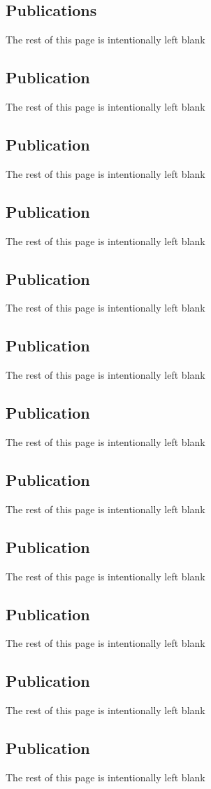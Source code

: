 \documentclass{article}
\def\lb{\vfill{The rest of this page is intentionally left blank}\vfill}
\begin{document}
\newpage
\center \subsection{Publications} 
 \lb 

\center \subsection{Publication} 
 \lb 

\center \subsection{Publication} 
 \lb 

\center \subsection{Publication} 
 \lb 

\center \subsection{Publication} 
 \lb 

\center \subsection{Publication} 
 \lb 

\center \subsection{Publication} 
 \lb 

\center \subsection{Publication} 
 \lb 

\center \subsection{Publication} 
 \lb 

\center \subsection{Publication} 
 \lb 

\center \subsection{Publication} 
 \lb 

\center \subsection{Publication} 
 \lb 


\end{document}
